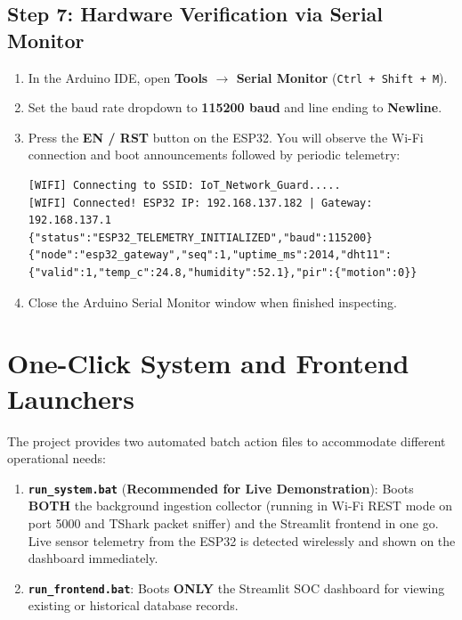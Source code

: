 \documentclass[11pt,a4paper]{article}
\begin{document}
\subsection{Step 7: Hardware Verification via Serial Monitor}
\begin{enumerate}
    \item In the Arduino IDE, open \textbf{Tools $\rightarrow$ Serial Monitor} (\texttt{Ctrl + Shift + M}).
    \item Set the baud rate dropdown to \textbf{115200 baud} and line ending to \textbf{Newline}.
    \item Press the \textbf{EN / RST} button on the ESP32. You will observe the Wi-Fi connection and boot announcements followed by periodic telemetry:
\begin{lstlisting}[numbers=none]
[WIFI] Connecting to SSID: IoT_Network_Guard.....
[WIFI] Connected! ESP32 IP: 192.168.137.182 | Gateway: 192.168.137.1
{"status":"ESP32_TELEMETRY_INITIALIZED","baud":115200}
{"node":"esp32_gateway","seq":1,"uptime_ms":2014,"dht11":{"valid":1,"temp_c":24.8,"humidity":52.1},"pir":{"motion":0}}
\end{lstlisting}
    \item Close the Arduino Serial Monitor window when finished inspecting.
\end{enumerate}

\section{One-Click System and Frontend Launchers}

The project provides two automated batch action files to accommodate different operational needs:
\begin{enumerate}
    \item \textbf{\texttt{run\_system.bat}} (\textbf{Recommended for Live Demonstration}): Boots \textbf{BOTH} the background ingestion collector (running in Wi-Fi REST mode on port 5000 and TShark packet sniffer) and the Streamlit frontend in one go. Live sensor telemetry from the ESP32 is detected wirelessly and shown on the dashboard immediately.
    \item \textbf{\texttt{run\_frontend.bat}}: Boots \textbf{ONLY} the Streamlit SOC dashboard for viewing existing or historical database records.
\end{enumerate}
\end{document}
